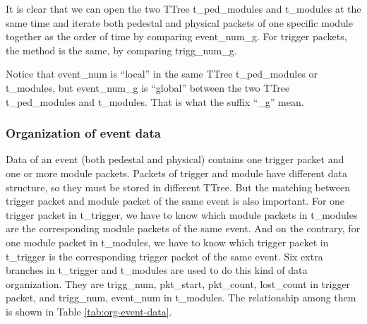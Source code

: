 \documentclass[a4paper, 12pt, onecolumn]{article}
\begin{document}
It is clear that we can open the two TTree t\_ped\_modules and t\_modules at the same time and iterate both pedestal
and physical packets of one specific module together as the order of time by comparing event\_num\_g.
For trigger packets, the method is the same, by comparing trigg\_num\_g.

Notice that event\_num is ``local'' in the same TTree t\_ped\_modules or t\_modules,
but event\_num\_g is ``global'' between the two TTree t\_ped\_modules and t\_modules. That is what the suffix ``\_g'' mean.

\subsubsection{Organization of event data}
Data of an event (both pedestal and physical) contains one trigger packet and one or more module packets.
Packets of trigger and module have different data structure, so they must be stored in different TTree.
But the matching between trigger packet and module packet of the same event is also important.
For one trigger packet in t\_trigger, we have to know which module packets in t\_modules are the corresponding module packets of the same event.
And on the contrary, for one module packet in t\_modules, we have to know which trigger packet in t\_trigger is the corresponding trigger packet of the same event.
Six extra branches in t\_trigger and t\_modules are used to do this kind of data organization.
They are trigg\_num, pkt\_start, pkt\_count, lost\_count in trigger packet, and trigg\_num, event\_num in t\_modules.
The relationship among them is shown in Table \ref{tab:org-event-data}.
\end{document}
